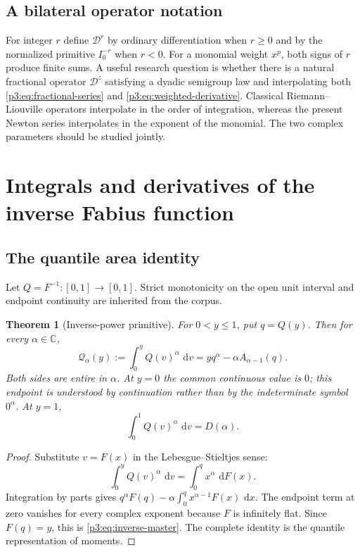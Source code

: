 \documentclass[11pt,oneside]{article}
\newtheorem{theorem}{Theorem}[section]
\theoremstyle{definition}
\theoremstyle{remark}
\newcommand{\C}{\mathbb C}
\newcommand{\dd}{\,\mathrm d}
\newcommand{\1}{\mathbf 1}
\begin{document}
\subsection{A bilateral operator notation}

For integer $r$ define $\mathscr D^r$ by ordinary differentiation when $r\ge0$ and by the
normalized primitive $I_0^{-r}$ when $r<0$.  For a monomial weight $x^p$, both signs of $r$
produce finite sums.  A useful research question is whether there is a natural fractional
operator $\mathscr D^z$ satisfying a dyadic semigroup law and interpolating both
\eqref{p3:eq:fractional-series} and \eqref{p3:eq:weighted-derivative}.  Classical
Riemann--Liouville operators interpolate in the order of integration, whereas the present
Newton series interpolates in the exponent of the monomial.  The two complex parameters
should be studied jointly.

\section{Integrals and derivatives of the inverse Fabius function}
\label{p3:sec:inverse}

\subsection{The quantile area identity}

Let $Q=F^{-1}:[0,1]\to[0,1]$.  Strict monotonicity on the open unit interval and endpoint
continuity are inherited from the corpus.

\begin{theorem}[Inverse-power primitive]
\label{p3:thm:inverse-master}
For $0<y\le1$, put $q=Q(y)$.  Then for every $\alpha\in\C$,
\begin{equation}
 \boxed{
 \mathcal Q_\alpha(y):=\int_0^yQ(v)^\alpha\,\dd v
 =yq^\alpha-\alpha A_{\alpha-1}(q).}
 \label{p3:eq:inverse-master}
\end{equation}
Both sides are entire in $\alpha$.  At $y=0$ the common continuous value is $0$; this endpoint is understood by continuation rather than by the indeterminate symbol $0^\alpha$.  At $y=1$,
\begin{equation}
 \int_0^1Q(v)^\alpha\,\dd v=D(\alpha).                       \label{p3:eq:inverse-complete}
\end{equation}
\end{theorem}

\begin{proof}
Substitute $v=F(x)$ in the Lebesgue--Stieltjes sense:
\[
 \int_0^yQ(v)^\alpha\,\dd v=\int_0^qx^\alpha\,\dd F(x).
\]
Integration by parts gives $q^\alpha F(q)-\alpha\int_0^qx^{\alpha-1}F(x)\,\dd x$.
The endpoint term at zero vanishes for every complex exponent because $F$ is infinitely
flat.  Since $F(q)=y$, this is \eqref{p3:eq:inverse-master}.  The complete identity is the
quantile representation of moments.
\end{proof}
\end{document}
